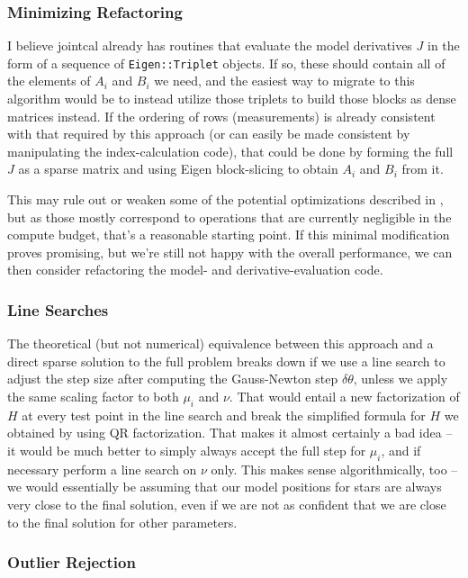\subsubsection{Minimizing Refactoring}

I believe jointcal already has routines that evaluate the model derivatives $J$ in the form of a sequence of \texttt{Eigen::Triplet} objects.
If so, these should contain all of the elements of $A_i$ and $B_i$ we need, and the easiest way to migrate to this algorithm would be to instead utilize those triplets to build those blocks as dense matrices instead.
If the ordering of rows (measurements) is already consistent with that required by this approach (or can easily be made consistent by manipulating the index-calculation code), that could be done by forming the full $J$ as a sparse matrix and using Eigen block-slicing to obtain $A_i$ and $B_i$ from it.

This may rule out or weaken some of the potential optimizations described in , but as those mostly correspond to operations that are currently negligible in the compute budget, that's a reasonable starting point.
If this minimal modification proves promising, but we're still not happy with the overall performance, we can then consider refactoring the model- and derivative-evaluation code.

\subsubsection{Line Searches}

The theoretical (but not numerical) equivalence between this approach and a direct sparse solution to the full problem breaks down if we use a line search to adjust the step size after computing the Gauss-Newton step $\delta\theta$, unless we apply the same scaling factor to both $\mu_i$ and $\nu$.
That would entail a new factorization of $H$ at every test point in the line search and break the simplified formula for $H$ we obtained by using QR factorization.
That makes it almost certainly a bad idea -- it would be much better to simply always accept the full step for $\mu_i$, and if necessary perform a line search on $\nu$ only.
This makes sense algorithmically, too -- we would essentially be assuming that our model positions for stars are always very close to the final solution, even if we are not as confident that we are close to the final solution for other parameters.

\subsubsection{Outlier Rejection}


